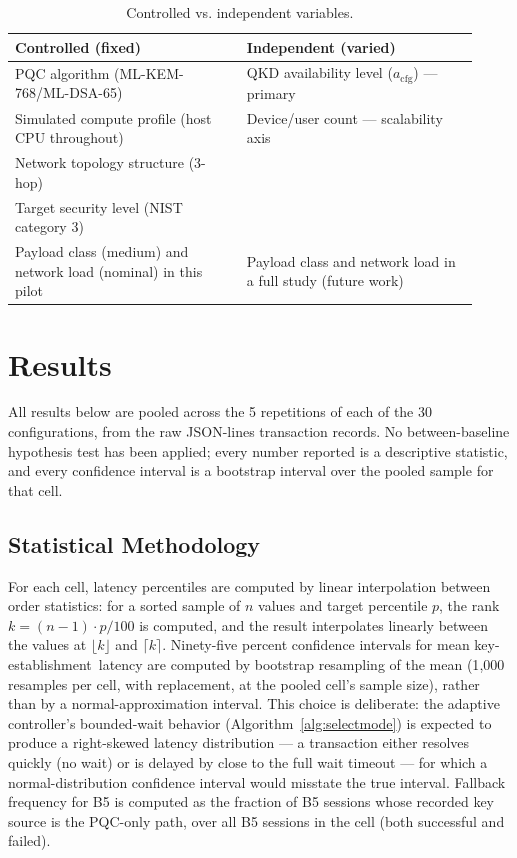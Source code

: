 \documentclass[journal]{IEEEtran}
\newcommand{\keyest}{key-establishment}
\newcommand{\acfg}{\ensuremath{a_{\text{cfg}}}}
\begin{document}
\begin{table}[t]
\centering
\caption{Controlled vs. independent variables.}
\label{tab:variables}
\small
\begin{tabular}{@{}p{0.46\linewidth}p{0.46\linewidth}@{}}
\toprule
Controlled (fixed) & Independent (varied) \\
\midrule
PQC algorithm (ML-KEM-768/ML-DSA-65) & QKD availability level ($\acfg$) --- primary \\
Simulated compute profile (host CPU throughout) & Device/user count --- scalability axis \\
Network topology structure (3-hop) & \\
Target security level (NIST category 3) & \\
Payload class (medium) and network load (nominal) in this pilot & Payload class and network load in a full study (future work) \\
\bottomrule
\end{tabular}
\end{table}

\section{Results}
\label{sec:results}

All results below are pooled across the 5 repetitions of each of the 30 configurations, from the raw JSON-lines transaction records. No between-baseline hypothesis test has been applied; every number reported is a descriptive statistic, and every confidence interval is a bootstrap interval over the pooled sample for that cell.

\subsection{Statistical Methodology}

For each cell, latency percentiles are computed by linear interpolation between order statistics: for a sorted sample of $n$ values and target percentile $p$, the rank $k = (n-1)\cdot p/100$ is computed, and the result interpolates linearly between the values at $\lfloor k \rfloor$ and $\lceil k \rceil$. Ninety-five percent confidence intervals for mean \keyest\ latency are computed by bootstrap resampling of the mean (1{,}000 resamples per cell, with replacement, at the pooled cell's sample size), rather than by a normal-approximation interval. This choice is deliberate: the adaptive controller's bounded-wait behavior (Algorithm~\ref{alg:selectmode}) is expected to produce a right-skewed latency distribution --- a transaction either resolves quickly (no wait) or is delayed by close to the full wait timeout --- for which a normal-distribution confidence interval would misstate the true interval. Fallback frequency for B5 is computed as the fraction of B5 sessions whose recorded key source is the PQC-only path, over all B5 sessions in the cell (both successful and failed).
\end{document}
